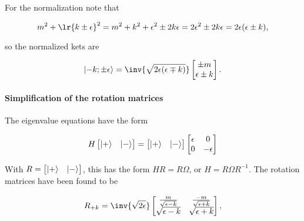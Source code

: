 For the normalization note that

\begin{dmath}\label{eqn:gradQuantumProblemSet4Problem3:201}
m^2 + \lr{ k \pm \epsilon }^2
=
m^2 + k^2 + \epsilon^2 \pm 2 k \epsilon
=
2 \epsilon^2 \pm 2 k \epsilon
= 
2 \epsilon (\epsilon \pm k),
\end{dmath}

so the normalized kets are

\begin{dmath}\label{eqn:gradQuantumProblemSet4Problem3:221}
\ket{-k; \pm\epsilon} = 
\inv{\sqrt{2 \epsilon(\epsilon \mp k)}}
\begin{bmatrix}
\pm m \\
\epsilon \pm k
\end{bmatrix}.
\end{dmath}

\paragraph{Simplification of the rotation matrices}

The eigenvalue equations have the form

\begin{dmath}\label{eqn:gradQuantumProblemSet4Problem3:240}
H
\begin{bmatrix}
\ket{+} & \ket{-}
\end{bmatrix}
=
\begin{bmatrix}
\ket{+} & \ket{-}
\end{bmatrix}
\begin{bmatrix}
\epsilon & 0 \\
0 & -\epsilon
\end{bmatrix}
\end{dmath}

With \( R = \begin{bmatrix} \left\lvert {+} \right\rangle & \left\lvert {-} \right\rangle \end{bmatrix} \), this has the form \( H R = R \Omega \), or \( H = R \Omega R^{-1} \).  The rotation matrices have been found to be

\begin{dmath}\label{eqn:gradQuantumProblemSet4Problem3:260}
R_{+k} 
= 
\inv{\sqrt{2\epsilon}}
\begin{bmatrix}
\frac{m}{\sqrt{\epsilon - k}} & \frac{-m}{\sqrt{\epsilon + k}} \\
\sqrt{\epsilon - k} & \sqrt{\epsilon + k} 
\end{bmatrix},
\end{dmath}

